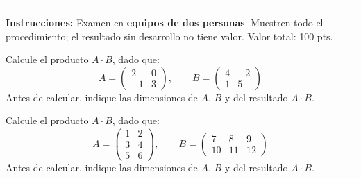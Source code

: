 \documentclass[12pt]{article}
\begin{document}
\vspace{0.2cm}
\noindent\rule{\textwidth}{0.8pt}
\vspace{0.15cm}

\noindent\textbf{Instrucciones:} Examen en \textbf{equipos de dos personas}. Muestren todo el procedimiento; el resultado sin desarrollo no tiene valor. Valor total: 100 pts.

\vspace{0.5cm}


\begin{ejercicio}[30 pts.]
Calcule el producto $A \cdot B$, dado que:
\[
A = \begin{pmatrix} 2 & 0 \\ -1 & 3 \end{pmatrix}, \qquad
B = \begin{pmatrix} 4 & -2 \\ 1 & 5 \end{pmatrix}
\]
Antes de calcular, indique las dimensiones de $A$, $B$ y del resultado $A\cdot B$.
\end{ejercicio}


\vspace{6cm}

\begin{ejercicio}[30 pts.]
Calcule el producto $A \cdot B$, dado que:
\[
A = \begin{pmatrix} 1 & 2 \\ 3 & 4 \\ 5 & 6 \end{pmatrix}, \qquad
B = \begin{pmatrix} 7 & 8 & 9 \\ 10 & 11 & 12 \end{pmatrix}
\]
Antes de calcular, indique las dimensiones de $A$, $B$ y del resultado $A\cdot B$.
\end{ejercicio}
\end{document}
